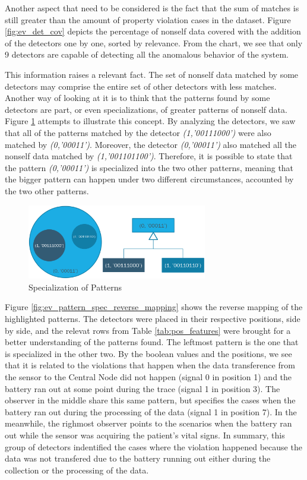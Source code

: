 Another aspect that need to be considered is the fact that the sum of matches is still greater than the amount of property violation cases in the dataset. Figure \ref{fig:ev_det_cov} depicts the percentage of nonself data covered with the addition of the detectors one by one, sorted by relevance. From the chart, we see that only 9 detectors are capable of detecting all the anomalous behavior of the system. 

This information raises a relevant fact. The set of nonself data matched by some detectors may comprise the entire set of other detectors with less matches. Another way of looking at it is to think that the patterns found by some detectors are part, or even specializations, of greater patterns of nonself data. Figure \ref{fig:ev_pattern_spec} attempts to illustrate this concept. By analyzing the detectors, we saw that all of the patterns matched by the detector \textit{(1,'00111000')} were also matched by \textit{(0,'00011')}. Moreover, the detector \textit{(0,'00011')} also matched all the nonself data matched by \textit{(1,'001101100')}. Therefore, it is possible to state that the pattern \textit{(0,'00011')} is specialized into the two other patterns, meaning that the bigger pattern can happen under two different circumstances, accounted by the two other patterns.

\begin{figure}[]
	\centering
	\includegraphics[width=0.7\textwidth, keepaspectratio]{img/pattern_specialization.png}
	\caption{Specialization of Patterns}
	\label{fig:ev_pattern_spec}
\end{figure}

Figure \ref{fig:ev_pattern_spec_reverse_mapping} shows the reverse mapping of the highlighted patterns. The detectors were placed in their respective positions, side by side, and the relevat rows from Table \ref{tab:pos_features} were brought for a better understanding of the patterns found. The leftmost pattern is the one that is specialized in the other two. By the boolean values and the positions, we see that it is related to the violations that happen when the data transference from the sensor to the Central Node did not happen (signal 0 in position 1) and the battery ran out at some point during the trace (signal 1 in position 3). The observer in the middle share this same pattern, but specifies the cases when the battery ran out during the processing of the data (signal 1 in position 7). In the meanwhile, the righmost observer points to the scenarios when the battery ran out while the sensor was acquiring the patient's vital signs. In summary, this group of detectors indentified the cases where the violation happened because the data was not transfered due to the battery running out either during the collection or the processing of the data.


